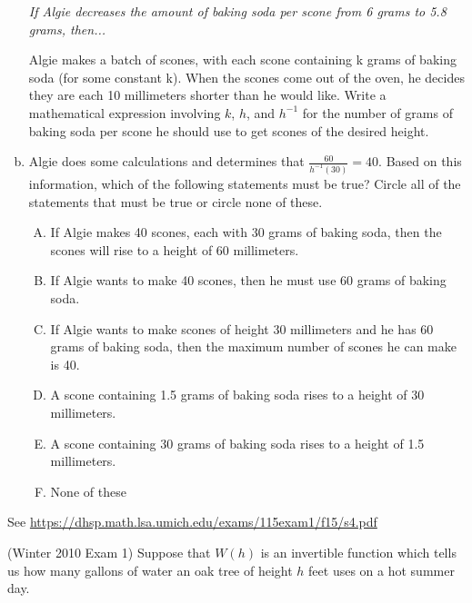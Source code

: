 \documentclass[11pt]{exam}
\begin{document}
\begin{questions}
\begin{enumerate}[(a)]
	\emph{If Algie decreases the amount of baking soda per scone from 6 grams to 5.8 grams, then...}
	
	Algie makes a batch of scones, with each scone containing k grams of baking soda (for some constant k). When the scones come out of the oven, he decides they are each 10 millimeters shorter than he would like. Write a mathematical expression involving $k$, $h$, and $h^{-1}$ for the number of grams of baking soda per scone he should use to get scones of the desired height.
	
	\item Algie does some calculations and determines that $\displaystyle\frac{60}{h^{-1}(30)}=40$.
	Based on this information, which of the following statements must be true?
Circle all of the statements that must be true or circle none of these.
\begin{enumerate}[A.]
\item If Algie makes 40 scones, each with 30 grams of baking soda, then the scones will rise to a height of 60 millimeters.
\item If Algie wants to make 40 scones, then he must use 60 grams of baking soda.
\item If Algie wants to make scones of height 30 millimeters and he has 60 grams of baking soda, then the maximum number of scones he can make is 40.
\item A scone containing 1.5 grams of baking soda rises to a height of 30 millimeters.
\item A scone containing 30 grams of baking soda rises to a height of 1.5 millimeters.
\item None of these
\end{enumerate}
\end{enumerate}
\begin{solution}
  See \href{https://dhsp.math.lsa.umich.edu/exams/115exam1/f15/s4.pdf}{https://dhsp.math.lsa.umich.edu/exams/115exam1/f15/s4.pdf}
\end{solution}
\question (Winter 2010 Exam 1) Suppose that $W(h)$ is an invertible function which tells us how many gallons of water an oak tree of height $h$ feet uses on a hot summer day.
	

\end{questions}
\end{document}
